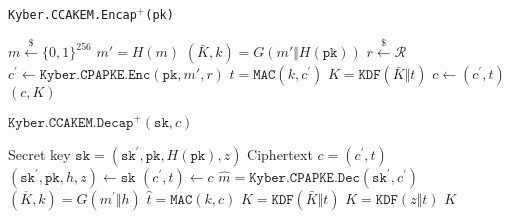 \documentclass[floatrow,journal=tches,submission]{iacrtrans}
\newcommand{\mac}{\texttt{MAC}}
\newcommand{\pk}{\texttt{pk}}
\newcommand{\sk}{\texttt{sk}}
\newcommand{\leftsample}{\stackrel{\$}{\leftarrow}}
\begin{document}
\begin{algorithm}[H]
    \caption{\texttt{Kyber.CCAKEM.Encap$^+$(\pk)}}\label{alg:kyber-ae-encap}
    \begin{algorithmic}[1]
        \State $m \leftsample \{0,1\}^{256}$
        \State $m'= H(m)$
        \State $(\bar{K}, k) = G(m' \Vert H(\pk))$
        \State $r \leftsample \mathcal{R}$
        \State $c^\prime  \leftarrow \texttt{Kyber.CPAPKE.Enc}(\pk, m', r)$
            \State $t=\mac(k, c^\prime)$
        \State $K = \texttt{KDF}(\bar{K} \Vert t)$
        \State $c \leftarrow (c^\prime, t)$
        \State \Return $(c, K)$
    \end{algorithmic}
\end{algorithm}

\begin{algorithm}[H]
    \caption{$\texttt{Kyber.CCAKEM.Decap}^+ (\sk, c)$}\label{alg:kyber-ae-decap}
    \begin{algorithmic}[1]
        \Require Secret key $\sk = (\sk^\prime, \pk, H(\pk), z)$
        \Require Ciphertext $c = (c^\prime, t)$
        \State $(\sk^\prime, \pk, h, z) \leftarrow \sk$
        \State $(c^\prime, t) \leftarrow c$
        \State $\hat{m} = \texttt{Kyber.CPAPKE.Dec}(\sk^\prime, c^\prime)$ 
        \State $(\overline{K}, k) =   G(m^\prime \Vert h)$
        \State $\hat{t}=\mac(k, c)$
            \State $K  = \texttt{KDF}(\bar{K} \Vert t)$ 
         \Else 
            \State $K  = \texttt{KDF}(z \Vert t)$ 
        \EndIf
            \State \Return $K$
    \end{algorithmic}
\end{algorithm}
\end{document}
